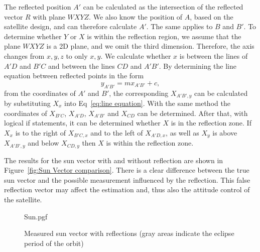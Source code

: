 The reflected position $A'$ can be calculated as the intersection of the reflected vector $R$ with plane $WXYZ$. We also know the position of $A$, based on the satellite design, and can therefore calculate $A'$. The same applies to $B$ and $B'$. To determine whether $Y$ or $X$ is within the reflection region, we assume that the plane $WXYZ$ is a 2D plane, and we omit the third dimension. Therefore, the axis changes from $x, y, z$ to only $x, y$. We calculate whether $x$ is between the lines of $A'D$ and $B'C$ and between the lines $CD$ and $A'B'$. By determining the line equation between reflected points in the form 
\begin{equation}
y_{A'B'} = mx_{A'B'} + c,
\label{eq:line equation}
\end{equation}
from the coordinates of $A'$ and $B'$, the corresponding $X_{A'B',y}$ can be calculated by substituting $X_x$ into Eq~\ref{eq:line equation}. With the same method the coordinates of $X_{B'C}$, $X_{A'D}$, $X_{A'B'}$ and $X_{CD}$ can be determined. After that, with logical if statements, it can be determined whether $X$ is in the reflection zone. If $X_x$ is to the right of $X_{B'C,x}$ and to the left of $X_{A'D,x}$, as well as $X_y$ is above $X_{A'B',y}$ and below $X_{CD,y}$ then $X$ is within the reflection zone. 

The results for the sun vector with and without reflection are shown in Figure~\ref{fig:Sun Vector comparison}. There is a clear difference between the true sun vector and the possible measurement influenced by the reflection.  This false reflection vector may affect the estimation and, thus also the attitude control of the satellite.

\begin{figure*}[!htb]
		\centering
		{Sun.pgf}
	\caption{Measured sun vector with reflections (gray areas indicate the eclipse period of the orbit)}
	
\end{figure*}


